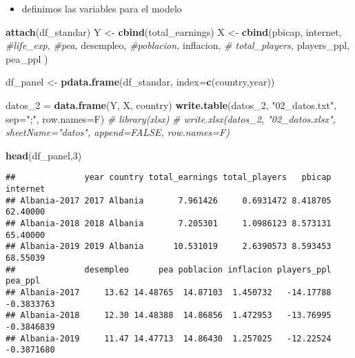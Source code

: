 \documentclass[
]{article}
\newenvironment{Shaded}{\begin{snugshade}}{\end{snugshade}}
\newcommand{\AttributeTok}[1]{\textcolor[rgb]{0.13,0.29,0.53}{#1}}
\newcommand{\CommentTok}[1]{\textcolor[rgb]{0.56,0.35,0.01}{\textit{#1}}}
\newcommand{\DecValTok}[1]{\textcolor[rgb]{0.00,0.00,0.81}{#1}}
\newcommand{\FunctionTok}[1]{\textcolor[rgb]{0.13,0.29,0.53}{\textbf{#1}}}
\newcommand{\NormalTok}[1]{#1}
\newcommand{\OtherTok}[1]{\textcolor[rgb]{0.56,0.35,0.01}{#1}}
\newcommand{\StringTok}[1]{\textcolor[rgb]{0.31,0.60,0.02}{#1}}
\providecommand{\tightlist}{%
  \setlength{\itemsep}{0pt}\setlength{\parskip}{0pt}}
\begin{document}
\begin{itemize}
\tightlist
\item
  definimos las variables para el modelo
\end{itemize}

\begin{Shaded}
\begin{Highlighting}[]
\FunctionTok{attach}\NormalTok{(df\_standar)}
\NormalTok{Y }\OtherTok{\textless{}{-}} \FunctionTok{cbind}\NormalTok{(total\_earnings)}
\NormalTok{X }\OtherTok{\textless{}{-}} \FunctionTok{cbind}\NormalTok{(pbicap, }
\NormalTok{           internet, }
           \CommentTok{\#life\_exp,}
           \CommentTok{\#pea,}
\NormalTok{           desempleo, }
           \CommentTok{\#poblacion,}
\NormalTok{           inflacion,}
           \CommentTok{\# total\_players,}
\NormalTok{           players\_ppl,}
\NormalTok{           pea\_ppl}
\NormalTok{           )}

\NormalTok{df\_panel }\OtherTok{\textless{}{-}} \FunctionTok{pdata.frame}\NormalTok{(df\_standar,}
                        \AttributeTok{index=}\FunctionTok{c}\NormalTok{(}\StringTok{\textquotesingle{}country\textquotesingle{}}\NormalTok{,}\StringTok{\textquotesingle{}year\textquotesingle{}}\NormalTok{))}


\NormalTok{datos\_2 }\OtherTok{=} \FunctionTok{data.frame}\NormalTok{(Y, X, country)}
\FunctionTok{write.table}\NormalTok{(datos\_2, }\StringTok{"02\_datos.txt"}\NormalTok{, }\AttributeTok{sep=}\StringTok{";"}\NormalTok{, }\AttributeTok{row.names=}\NormalTok{F)  }
\CommentTok{\# library(xlsx)}
\CommentTok{\# write.xlsx(datos\_2, "02\_datos.xlsx", sheetName="datos", append=FALSE, row.names=F)}

\FunctionTok{head}\NormalTok{(df\_panel,}\DecValTok{3}\NormalTok{)}
\end{Highlighting}
\end{Shaded}

\begin{verbatim}
##              year country total_earnings total_players   pbicap internet
## Albania-2017 2017 Albania       7.961426     0.6931472 8.418705 62.40000
## Albania-2018 2018 Albania       7.205301     1.0986123 8.573131 65.40000
## Albania-2019 2019 Albania      10.531019     2.6390573 8.593453 68.55039
##              desempleo      pea poblacion inflacion players_ppl    pea_ppl
## Albania-2017     13.62 14.48765  14.87103  1.450732   -14.17788 -0.3833763
## Albania-2018     12.30 14.48388  14.86856  1.472953   -13.76995 -0.3846839
## Albania-2019     11.47 14.47713  14.86430  1.257025   -12.22524 -0.3871680
\end{verbatim}
\end{document}
